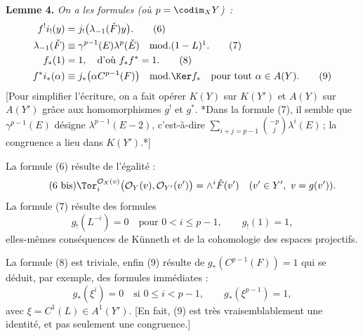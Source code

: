 \textbf{Lemme 4.} \emph{On a les formules (où \(p=\codim_XY\))~:}
\begin{align}
  f^!i_!(y)&=j_!\bigl(\lambda_{-1}(\check F)y\bigr). \tag{6}\\
  \lambda_{-1}(\check F)&\equiv \gamma^{p-1}(E)\lambda^p(\check E)
    \quad\text{mod.}(1-L)\footnotemark. \tag{7}\\
  f_*(1)&=1,\quad\text{d'où }f_*f^*=1. \tag{8}\\
  f^*i_*(\alpha)&\equiv j_*\bigl(\alpha C^{p-1}(F)\bigr)
    \quad\text{mod.}\Ker f_*\quad\text{pour tout }\alpha\in A(Y). \tag{9}
\end{align}
[Pour simplifier l'écriture, on a fait opérer \(K(Y)\) sur \(K(Y')\) et \(A(Y)\) sur \(A(Y')\) grâce aux homomorphismes \(g^!\) et \(g^*\). {*}Dans la formule (7), il semble que \(\gamma^{p-1}(E)\) désigne \(\lambda^{p-1}(E-2)\), c'est-à-dire \(\sum_{i+j=p-1}\binom{-p}{j}\lambda^i(E)\)\,; la congruence a lieu dans \(K(Y')\).{*}]

La formule (6) résulte de l'égalité :
\begin{equation}\tag{6 bis}
  \Tor_i^{\mathcal O_X(v)}\bigl(\mathcal O_Y(v),\mathcal O_{Y'}(v')\bigr)
  =
  \wedge^i\check F(v')
  \quad (v'\in Y',\ v=g(v')).
\end{equation}
La formule (7) résulte des formules
\begin{equation}\tag{10}
  g_!(L^{-i})=0\quad\text{pour }0<i\leq p-1,\qquad g_!(1)=1,
\end{equation}
elles-mêmes conséquences de Künneth et de la cohomologie des espaces projectifs.

La formule (8) est triviale, enfin (9) résulte de \(g_*(C^{p-1}(F))=1\) qui se déduit, par exemple, des formules immédiates :
\begin{equation}\tag{10 bis}
  g_*(\xi^i)=0\quad\text{si }0\leq i<p-1,\qquad
  g_*(\xi^{p-1})=1,
\end{equation}
avec \(\xi=C^1(L)\in A^1(Y')\). [En fait, (9) est très vraisemblablement une identité, et pas seulement une congruence.]

